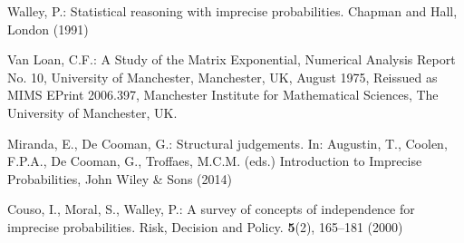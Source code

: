 
% 
%
%
% 
% 
%
\biblstarthook{}

\begin{thebibliography}{99.}%
%
%
%
%
%
%
%


Walley, P.: {Statistical reasoning with imprecise probabilities}. Chapman and
  Hall, London (1991)

Van Loan, C.F.: {A Study of the Matrix Exponential}, Numerical Analysis Report No. 10, University of Manchester, Manchester, UK, August 1975, {Reissued as MIMS EPrint 2006.397}, Manchester Institute for Mathematical Sciences, The University of Manchester, UK.

Miranda, E., De Cooman, G.: {Structural judgements}. In: Augustin, T., Coolen, F.P.A., De Cooman, G., Troffaes, M.C.M. (eds.) Introduction to Imprecise Probabilities, {John Wiley \& Sons} (2014) 

 Couso, I., Moral, S., Walley, P.: {A survey of concepts of independence for imprecise probabilities}. Risk, Decision and Policy. \textbf{5}(2), 165--181 (2000)


\end{thebibliography}
